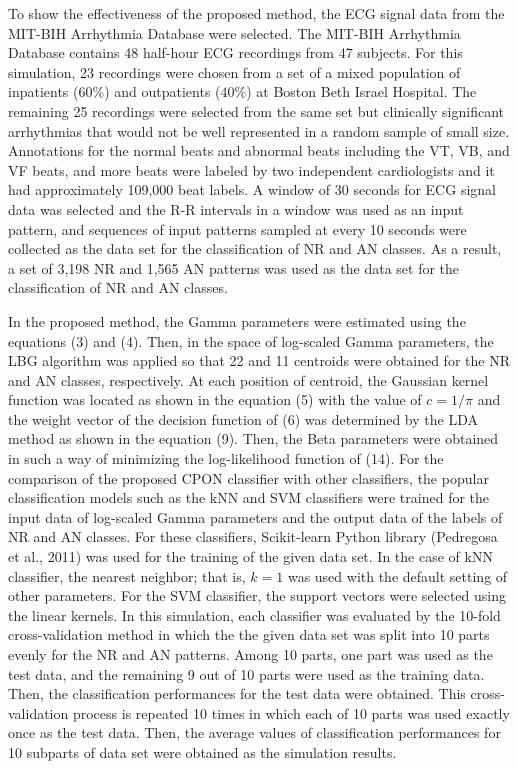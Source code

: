 \documentclass[times,twocolumn,final,authoryear]{elsarticle}
\begin{document}
To show the effectiveness of the proposed method, the ECG signal data from the MIT-BIH Arrhythmia Database were selected. The MIT-BIH Arrhythmia Database contains 48 half-hour ECG recordings from 47 subjects. For this simulation, 23 recordings were chosen from a set of a mixed population of inpatients ($60\%$) and outpatients ($40\%$) at Boston Beth Israel Hospital. The remaining 25 recordings were selected from the same set but clinically significant arrhythmias that would not be well represented in a random sample of small size. Annotations for the normal beats and abnormal beats including the VT, VB, and VF beats, and more beats were labeled by two independent cardiologists and it had approximately 109,000 beat labels. A window of 30 seconds for ECG signal data was selected and the R-R intervals in a window was used as an input pattern, and sequences of input patterns sampled at every 10 seconds were collected as the data set for the classification of NR and AN classes. As a result, a set of 3,198 NR and 1,565 AN patterns was used as the data set for the classification of  NR and AN classes. 

In the proposed method, the Gamma parameters were estimated using the equations (3) and (4). Then, in the space of log-scaled Gamma parameters, the LBG algorithm was applied so that 22 and 11 centroids were obtained for the NR and AN classes, respectively. At each position of centroid, the Gaussian kernel function was located as shown in the equation (5) with the value of $c=1/\pi$ and the weight vector of the decision function of (6) was determined by the LDA method as shown in the equation (9). Then, the Beta parameters were obtained in such a way of minimizing the log-likelihood function of (14). For the comparison of the proposed CPON classifier with other classifiers, the popular classification 
models such as the kNN and SVM classifiers were trained for the input data of log-scaled Gamma parameters and the output data of the labels of NR and AN classes. For these classifiers, Scikit-learn Python library (Pedregosa et al., 2011) was used for the training of the given data set. In the case of kNN classifier, the nearest neighbor; that is, $k = 1$ was used with the default setting of other parameters. For the SVM classifier, the support vectors were selected using the linear kernels. In this simulation, each classifier was evaluated by the 10-fold cross-validation method in which the the given data set was split into 10 parts evenly for the NR and AN patterns. Among 10 parts, one part was used as the test data, and the remaining 9 out of 10 parts were used as the training data. Then, the classification performances for the test data were obtained. This cross-validation process is repeated 10 times in which each of 10 parts was used exactly once as the test data. Then, the average values of classification performances for 10 subparts of data set were obtained as the simulation results.
\end{document}
